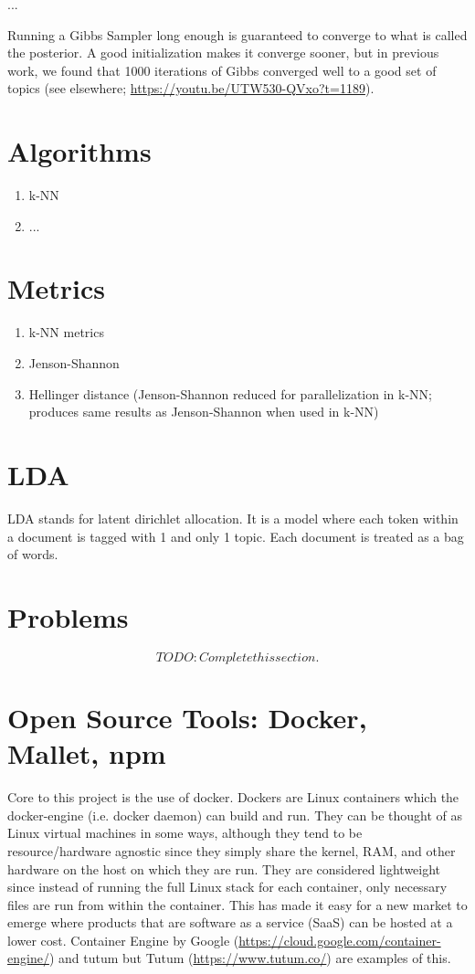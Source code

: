 ...

Running a Gibbs Sampler long enough is guaranteed to converge to what is called the posterior. A good initialization makes it converge sooner, but in previous work, we found that 1000 iterations of Gibbs converged well to a good set of topics (see elsewhere; \url{https://youtu.be/UTW530-QVxo?t=1189}).

\section{Algorithms}
\begin{enumerate}
  \item k-NN
  \item ...
\end{enumerate}

\section{Metrics}
\begin{enumerate}
  \item k-NN metrics
  \item Jenson-Shannon
  \item Hellinger distance (Jenson-Shannon reduced for parallelization in k-NN; produces same results as Jenson-Shannon when used in k-NN)
\end{enumerate}

\section{LDA}
LDA stands for latent dirichlet allocation. It is a model where each token within a document is tagged with 1 and only 1 topic. Each document is treated as a bag of words.

\section{Problems}
\[TODO: Complete this section.\]

\section{Open Source Tools: Docker, Mallet, npm}
Core to this project is the use of docker. Dockers are Linux containers which the docker-engine (i.e. docker daemon) can build and run. They can be thought of as Linux virtual machines in some ways, although they tend to be resource/hardware agnostic since they simply share the kernel, RAM, and other hardware on the host on which they are run. They are considered lightweight since instead of running the full Linux stack for each container, only necessary files are run from within the container. This has made it easy for a new market to emerge where products that are software as a service (SaaS) can be hosted at a lower cost. Container Engine by Google (\url{https://cloud.google.com/container-engine/}) and tutum but Tutum (\url{https://www.tutum.co/}) are examples of this.

